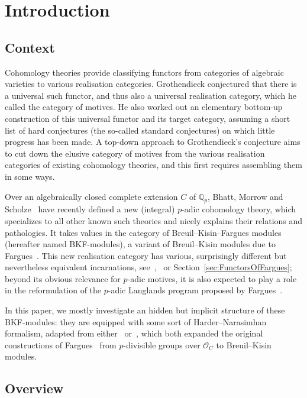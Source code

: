 \section{Introduction}

\subsection{Context}

Cohomology theories provide classifying functors from categories of algebraic varieties to various realisation categories. Grothendieck conjectured that there is a universal such functor, and thus also a universal realisation category, which he called the category of motives. He also worked out an elementary bottom-up construction of this universal functor and its target category, assuming a short list of hard conjectures (the so-called standard conjectures) on which little progress has been made. A top-down approach to Grothendieck's conjecture aims to cut down the elusive category of motives from the various realisation categories of existing cohomology theories, and this first requires assembling them in some ways.

Over an algebraically closed complete extension $C$ of $\mathbb{Q}_{p}$, Bhatt, Morrow and Scholze~\cite{BaMoSc16} have recently defined a new (integral) $p$-adic cohomology theory, which specializes to all other known such theories and nicely explains their relations and pathologies. It takes values in the category of Breuil--Kisin--Fargues modules (hereafter named BKF-modules), a variant of Breuil--Kisin modules due to Fargues~\cite{Fa15}. This new realisation category has various, surprisingly different but nevertheless equivalent incarnations, see~\cite[14.1.1]{ScWe15},~\cite[7.5]{Sc17} or Section~\ref{sec:FunctorsOfFargues}; beyond its obvious relevance for $p$-adic motives, it is also expected to play a role in the reformulation of the $p$-adic Langlands program proposed by Fargues~\cite{Fa16}.

In this paper, we mostly investigate an hidden but implicit structure of these BKF-modules: they are equipped with some sort of Harder--Narasimhan formalism, adapted from either~\cite{Imp16} or~\cite{LeWE16}, which both expanded the original constructions of Fargues~\cite{Fa12} from $p$-divisible groups over $\mathcal{O}_{C}$ to Breuil--Kisin modules.

\subsection{Overview}

